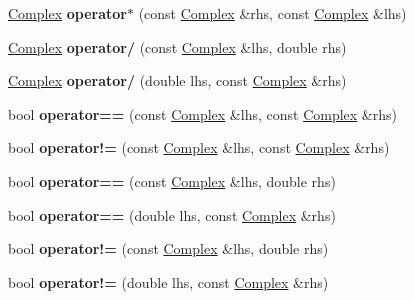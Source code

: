 \begin{DoxyCompactItemize}
\item 
\mbox{\label{classComplex_a96f4f298e72a81883672eb390e151687}} 
\hyperlink{classComplex}{Complex} {\bfseries operator$\ast$} (const \hyperlink{classComplex}{Complex} \&rhs, const \hyperlink{classComplex}{Complex} \&lhs)
\item 
\mbox{\label{classComplex_a2f83f0b45c961481f4a770015987ab65}} 
\hyperlink{classComplex}{Complex} {\bfseries operator/} (const \hyperlink{classComplex}{Complex} \&lhs, double rhs)
\item 
\mbox{\label{classComplex_a50e2d7b7de78e5a15e875db0a0b7cd79}} 
\hyperlink{classComplex}{Complex} {\bfseries operator/} (double lhs, const \hyperlink{classComplex}{Complex} \&rhs)
\item 
\mbox{\label{classComplex_a74299d39e590ee073c044e6515026e4c}} 
bool {\bfseries operator==} (const \hyperlink{classComplex}{Complex} \&lhs, const \hyperlink{classComplex}{Complex} \&rhs)
\item 
\mbox{\label{classComplex_a038f44233af24bcbf5386cff932129c9}} 
bool {\bfseries operator!=} (const \hyperlink{classComplex}{Complex} \&lhs, const \hyperlink{classComplex}{Complex} \&rhs)
\item 
\mbox{\label{classComplex_a7bfb3c8e6d5305a2e1fd35b65b769177}} 
bool {\bfseries operator==} (const \hyperlink{classComplex}{Complex} \&lhs, double rhs)
\item 
\mbox{\label{classComplex_addc4d2972fa9b485672f6280b9662a6c}} 
bool {\bfseries operator==} (double lhs, const \hyperlink{classComplex}{Complex} \&rhs)
\item 
\mbox{\label{classComplex_aa758a7e07ce04bd59ace05a8c76a32c5}} 
bool {\bfseries operator!=} (const \hyperlink{classComplex}{Complex} \&lhs, double rhs)
\item 
\mbox{\label{classComplex_a8a7daff739159661e2ca8d3b5567f54b}} 
bool {\bfseries operator!=} (double lhs, const \hyperlink{classComplex}{Complex} \&rhs)
\item 
\mbox{\label{classComplex_a555b5046f4568f2283dbf0da344f6568}} 

\end{DoxyCompactItemize}

